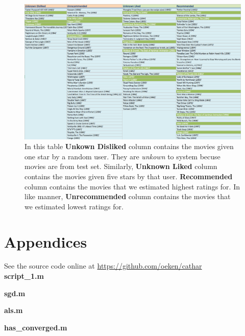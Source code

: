 \documentclass[11pt]{article}
\begin{document}
	\begin{figure}[H]
		\centering		
		\includegraphics[width=1\columnwidth]{buff5/recom}
		\caption{In this table \textbf{Unkown Disliked} column contains the movies given one star by a random user. They are \textit{unkown} to system becuse movies are from test set. Similarly, \textbf{Unknown Liked} column contains the movies given five stars by that user. \textbf{Recommended} column contains the movies that we estimated highest ratings for. In like manner, \textbf{Unrecommended} column contains the movies that we estimated lowest ratings for.}
		\label{5}		
	\end{figure}
	\clearpage

\section{Appendices}

	See the source code online at \url{https://github.com/oeken/cathar} \\ 
		
	\noindent \large \textbf{script\_1.m}	
	
	\vspace{5mm}
	
	\noindent \large \textbf{sgd.m}	
	
	\vspace{5mm}

	\newpage
	\noindent \large \textbf{als.m}	
	
	\vspace{5mm}
	
	\noindent \large \textbf{has\_converged.m}	
	
	\vspace{5mm}
	
\end{document}
